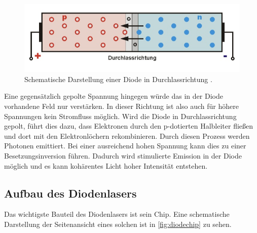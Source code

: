 \begin{figure}[H]
    \centering
    \includegraphics[width=\textwidth]{data/diode.jpg}
    \caption{Schematische Darstellung einer Diode in Durchlassrichtung \cite{Diode}.}
    \label{fig:diode}
\end{figure}
\noindent
Eine gegensätzlich gepolte Spannung hingegen würde das in der Diode vorhandene Feld nur verstärken. In dieser Richtung ist also auch für höhere Spannungen kein Stromfluss möglich.
\newline
Wird die Diode in Durchlassrichtung gepolt, führt dies dazu, dass Elektronen durch den p-dotierten Halbleiter fließen und dort mit den Elektronlöchern rekombinieren. Durch diesen
Prozess werden Photonen emittiert. Bei einer ausreichend hohen Spannung kann dies zu einer Besetzungsinversion führen. Dadurch wird stimulierte Emission in der Diode möglich
und es kann kohärentes Licht hoher Intensität entstehen.


\subsection{Aufbau des Diodenlasers}

Das wichtigste Bauteil des Diodenlasers ist sein Chip. Eine schematische Darstellung der Seitenansicht eines solchen ist in \autoref{fig:diodechip} zu sehen.

